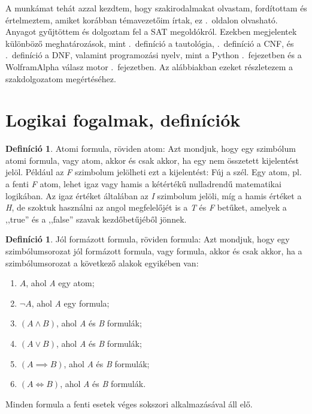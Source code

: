 \documentclass[
]{thesis-ekf}
\theoremstyle{definition}
\newtheorem{definicio}[tetel]{Definíció}
\theoremstyle{remark}
\begin{document}
	A munkámat tehát azzal kezdtem, hogy szakirodalmakat olvastam, fordítottam és értelmeztem, amiket korábban témavezetőim írtak, ez \az{\pageref{sec-szakirodalom-forditas}}.~oldalon olvasható. Anyagot gyűjtöttem és dolgoztam fel a \textsc{SAT} megoldókról. Ezekben megjelentek különböző meghatározások, mint \az{\ref{def-tautologia}}.~definíció a tautológia, \az{\ref{def-cnf}}.~definíció a \textsc{CNF}, és \az{\ref{def-dnf}}.~definíció a \textsc{DNF}, valamint programozási nyelv, mint a Python \az{\ref{ssec-python-programnyelv}}.~fejezetben és a WolframAlpha válasz motor \az{\ref{ssec-wolframalpha-hasznalata}}.~fejezetben. Az alábbiakban ezeket részletezem a szakdolgozatom megértéséhez.
	
\section{Logikai fogalmak, definíciók}\label{sec-alap-fogalmak-logika}

\begin{definicio}
	Atomi formula, röviden atom: Azt mondjuk, hogy egy szimbólum atomi formula, vagy atom, akkor és csak akkor, ha egy nem összetett kijelentést jelöl. Például az \emph{F} szimbolum jelölheti ezt a kijelentést: Fúj a szél. Egy atom, pl. a fenti \emph{F} atom, lehet igaz vagy hamis a kétértékű nulladrendű matematikai logikában. Az igaz értéket általában az \emph{I} szimbolum jelöli, míg a hamis értéket a \emph{H}, de szoktuk használni az angol megfelelőjét is a \emph{T} és \emph{F} betűket, amelyek a ,,true'' és a ,,false'' szavak kezdőbetűjéből jönnek.
\end{definicio}

\begin{definicio}		
	Jól formázott formula, röviden formula: Azt mondjuk, hogy egy szimbólumsorozat jól formázott formula, vagy formula, akkor és csak akkor, ha a szimbólumsorozat a következő alakok egyikében van:
	\begin{enumerate}[label=\textit{(\alph*)}]
		\item $ A $, ahol \emph{A} egy atom;
		\item $ \neg A $, ahol \emph{A} egy formula;
		\item $ (A \wedge B) $, ahol \emph{A} és \emph{B} formulák;
		\item $ (A \vee B) $, ahol \emph{A} és \emph{B} formulák;
		\item $ (A \implies B) $, ahol \emph{A} és \emph{B} formulák;
		\item $ (A \Leftrightarrow B) $, ahol \emph{A} és \emph{B} formulák.
	\end{enumerate}
	Minden formula a fenti esetek véges sokszori alkalmazásával áll elő.
\end{definicio}
\end{document}
